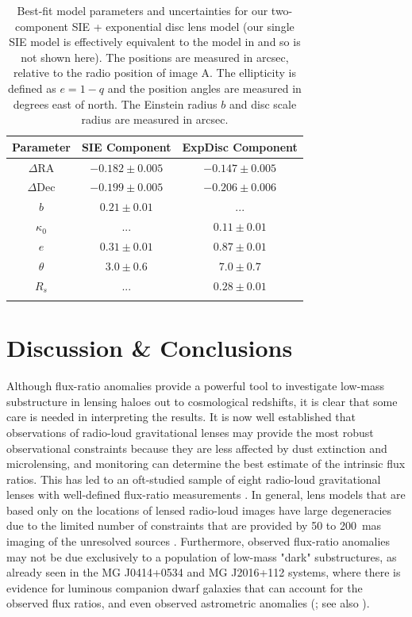 \documentclass[a4paper,fleqn,usenatbib,useAMS]{mnras}
\begin{document}
\begin{table}
\centering
\caption{Best-fit model parameters and uncertainties for our two-component SIE + exponential disc lens model (our single SIE model is effectively equivalent to the model in \citet{Marlow99} and so is not shown here). The positions are measured in arcsec, relative to the radio position of image A. The ellipticity is defined as $e=1-q$ and the position angles are measured in degrees east of north. The Einstein radius $b$ and disc scale radius are measured in arcsec.}
\begin{tabular}{ccc}
\hline 
Parameter    & SIE Component & ExpDisc Component  \\
\hline
$\Delta$RA	& $-0.182 \pm 0.005$		& $-0.147 \pm 0.005$\\
$\Delta$Dec	& $-0.199 \pm 0.005$		& $-0.206 \pm 0.006$ \\
$b$ 			& $0.21 \pm 0.01$  		& ...  \\
$\kappa_0$ & ... &$0.11 \pm 0.01$\\
$e$	  		& $0.31 \pm 0.01$			& $0.87 \pm 0.01$ \\
$\theta$ 		& $3.0 \pm 0.6$			& $7.0 \pm 0.7$	 \\
$R_s$			& ...  						& $0.28 \pm 0.01$	 \\
\hline
\label{tab:model}
\end{tabular}
\end{table}


\section{Discussion \& Conclusions}

Although flux-ratio anomalies provide a powerful tool to investigate low-mass substructure in lensing haloes out to cosmological redshifts, it is clear that some care is needed in interpreting the results. It is now well established that observations of radio-loud gravitational lenses may provide the most robust observational constraints because they are less affected by dust extinction and microlensing, and monitoring can determine the best estimate of the intrinsic flux ratios. This has led to an oft-studied sample of eight radio-loud gravitational lenses with well-defined flux-ratio measurements \citep{Dalal2002,KD04,Xu15}. In general, lens models that are based only on the locations of lensed radio-loud images have large degeneracies due to the limited number of constraints that are provided by 50 to 200~mas imaging of the unresolved sources \citep[e.g.][]{Ka91}. Furthermore, observed flux-ratio anomalies may not be due exclusively to a population of low-mass "dark" substructures, as already seen in the MG J0414+0534 and MG J2016+112 systems, where there is evidence for luminous companion dwarf galaxies that can account for the observed flux ratios, and even observed astrometric anomalies (\citealt{ros00,chen07,more09}; see also \citealt{mckean07,jackson10}). 
\end{document}
